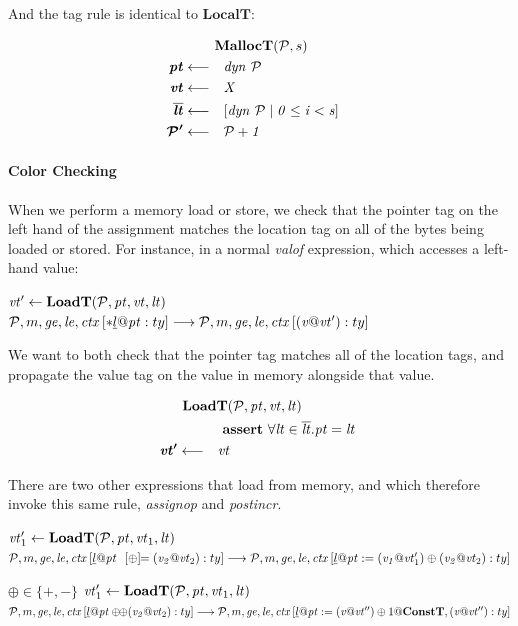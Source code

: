 \documentclass{article}
\begin{document}
And the tag rule is identical to \(\mathbf{LocalT}\):
                  
\[\begin{aligned}
\truledef{\malloct{\PCT}{s}}
\settag{\pt}{dyn ~ \PCT}
\settag{\vt}{X}
\settag{\overline{\lt}}{\left[dyn ~ \PCT \mid 0 \leq i < s\right]}
\settag{\PCT'}{\PCT + 1}
\end{aligned}\]

\paragraph*{Color Checking}

When we perform a memory load or store, we check that the pointer tag on the left hand
of the assignment matches the location tag on all of the bytes being loaded or stored.
For instance, in a normal {\it valof} expression, which accesses a left-hand value:

            {\(\mathit{vt}' \leftarrow \mathbf{LoadT}(\mathcal{P},\mathit{pt},\mathit{vt},\mathit{lt})\)}
            {\(\mathcal{P}, m, \mathit{ge}, \mathit{le}, \mathit{ctx}\left[* \underline{l}@\mathit{pt} : ty\right]
              \longrightarrow
              \mathcal{P}, m, \mathit{ge}, \mathit{le}, \mathit{ctx}\left[(\mathit{v} @ \mathit{vt}') : ty\right]\)}

We want to both check that the pointer tag matches all of the location tags, and propagate the
value tag on the value in memory alongside that value.

\[\begin{aligned}
\truledef{\loadt{\PCT}{\pt}{\vt}{\lt}}
\assert{\forall \lt \in \overline{\lt} . \pt = \lt}
\settag{\vt'}{\vt}
\end{aligned}\]

There are two other expressions that load from memory, and which therefore invoke
this same rule, {\it assignop} and {\it postincr}.

            {\(\mathit{vt}_1' \leftarrow \mathbf{LoadT}(\mathcal{P},\mathit{pt},\mathit{vt}_1,\mathit{lt})\)}
            {\(\mathcal{P}, m, \mathit{ge}, \mathit{le}, \mathit{ctx}\left[\underline{l}@\mathit{pt} ~~ [\oplus]\!\!= (\mathit{v_2} @ \mathit{vt}_2) : ty\right]
              \longrightarrow
              \mathcal{P}, m, \mathit{ge}, \mathit{le}, \mathit{ctx}\left[\underline{l}@\mathit{pt} := (\mathit{v_1} @ \mathit{vt}_1') \oplus (\mathit{v_2} @ \mathit{vt}_2) : ty\right]\)}
            
              {\(\oplus \in \{+,-\}\)}
              {\(\mathit{vt}_1' \leftarrow \mathbf{LoadT}(\mathcal{P},\mathit{pt},\mathit{vt}_1,\mathit{lt})\)}
              {\(\mathcal{P}, m, \mathit{ge}, \mathit{le}, \mathit{ctx}\left[\underline{l}@\mathit{pt} \oplus\!\!\oplus
                  {(\mathit{v_2} @ \mathit{vt}_2)} : ty\right]
                \longrightarrow
                \mathcal{P}, m, \mathit{ge}, \mathit{le}, \mathit{ctx}\left[\underline{l}@\mathit{pt} := (\mathit{v} @ \mathit{vt}'') \oplus 1@\mathbf{ConstT}, (\mathit{v} @ \mathit{vt}'') : ty\right]\)}
\end{document}
